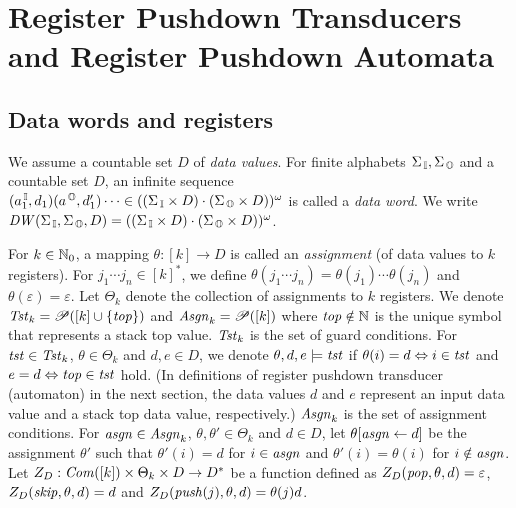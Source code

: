 \section{Register Pushdown Transducers and Register Pushdown Automata}
\subsection{Data words and registers}
We assume a countable set $D$ of \emph{data values}.
For finite alphabets $\Sigma_{\, \mathbb{I}},\Sigma_{\, \mathbb{O}}$ and a countable set $D$,
an infinite sequence $(a^{\, \mathbb{I}}_1,d_1)(a^{\, \mathbb{O}},d'_1)\cdots \in ((\Sigma_{\, \mathbb{I}}\times D)\cdot(\Sigma_{\, \mathbb{O}}\times D))^\omega$ is called a \emph{data word}.
We write $\mathit{DW}(\Sigma_{\, \mathbb{I}},\Sigma_{\, \mathbb{O}},D)=((\Sigma_{\, \mathbb{I}}\times D)\cdot(\Sigma_{\, \mathbb{O}}\times D))^\omega$.

For $k\in\mathbb{N}_0$, a mapping $\theta: [k] \to D$ is called an \emph{assignment}
(of data values to $k$ registers).
For $j_1\cdots j_n\in [k]^*$, we define $\theta(j_1\cdots j_n)=\theta(j_1)\cdots\theta(j_n)$ and $\theta(\varepsilon) = \varepsilon$.
Let $\Theta_k$ denote the collection of assignments to $k$ registers.
We denote $\mathit{Tst}_k = \mathscr{P}([k]\cup\{\mathit{top}\})$ and $\mathit{Asgn}_k = \mathscr{P}([k])$
where $\mathit{top}\notin\mathbb{N}$ is the unique symbol that represents a stack top value.
$\mathit{Tst}_k$ is the set of guard conditions.
For $\mathit{tst}\in\mathit{Tst}_k$, $\theta\in\Theta_k$ and $d,e\in D$,
we denote $\theta,d,e\models\mathit{tst}$ if $\theta(i) = d \Leftrightarrow i\in\mathit{tst}$
and $e = d \Leftrightarrow \mathit{top}\in\mathit{tst}$ hold.
(In definitions of register pushdown transducer (automaton) in the next section,
the data values $d$ and $e$ represent an input data value and a stack top data value, respectively.)
$\mathit{Asgn}_k$ is the set of assignment conditions.
For $\mathit{asgn}\in\mathit{Asgn}_k$, $\theta,\theta'\in\Theta_k$ and $d\in D$,
let $\theta[\mathit{asgn}\leftarrow d]$ be the assignment
$\theta'$ such that $\theta'(i) = d$ for $i\in\mathit{asgn}$ and $\theta'(i)=\theta(i)$ for $i\notin\mathit{asgn}$.
Let $Z_D: \mathit{Com}([k])\times \Theta_k\times D \to D^*$ be a function defined as
$Z_D(\mathit{pop},\theta,d)=\varepsilon$, $Z_D(\mathit{skip},\theta,d)=d$ and $Z_D(\mathit{push}(j),\theta,d)=\theta(j)d$.

